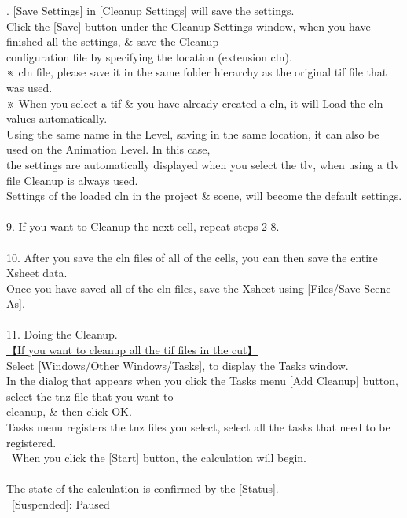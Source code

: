 \documentclass[a4paper,10pt]{article}
\begin{document}
. [Save Settings] in [Cleanup Settings] will save the settings.\\
\footnotesize
Click the [Save] button under the Cleanup Settings window, when you have finished all the settings, \& save the Cleanup\\
configuration file by specifying the location (extension cln).\\
※ cln file, please save it in the same folder hierarchy as the original tif file that was used.\\
※ When you select a tif \& you have already created a cln, it will Load the cln values automatically.\\
Using the same name in the Level, saving in the same location, it can also be used on the Animation Level. In this case,\\
the settings are automatically displayed when you select the tlv, when using a tlv file Cleanup is always used.\\
Settings of the loaded cln in the project \& scene, will become the default settings.\\
\\
\small
9. If you want to Cleanup the next cell, repeat steps 2-8.\\
\\
10. After you save the cln files of all of the cells, you can then save the entire Xsheet data.\\
\footnotesize
Once you have saved all of the cln files, save the Xsheet using [Files/Save Scene As].\\
\\
\small
11. Doing the Cleanup.\\
\footnotesize
\uline{【If you want to cleanup all the tif files in the cut】}\\
Select [Windows/Other Windows/Tasks], to display the Tasks window.\\
In the dialog that appears when you click the Tasks menu [Add Cleanup] button, select the tnz file that you want to\\
cleanup, \& then click OK.\\
Tasks menu registers the tnz files you select, select all the tasks that need to be registered.\\
\ When you click the [Start] button, the calculation will begin.\\
\\
The state of the calculation is confirmed by the [Status].\\
\ [Suspended]: Paused\\
\end{document}
